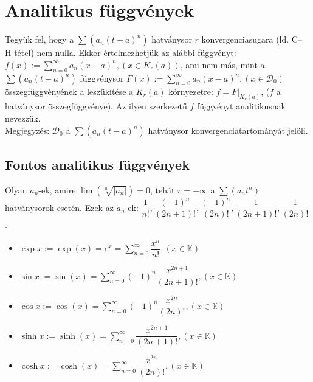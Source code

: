 \documentclass[margin=0px]{article}
\begin{document}
	\section{Analitikus függvények}
	
	Tegyük fel, hogy a $\sum{(a_{n}(t-a)^{n})}$ hatványsor $r$ konvergenciasugara (ld. C--H-tétel) nem nulla. Ekkor értelmezhetjük az alábbi függvényt: $f(x) := \sum\limits_{n=0}^{\infty}{a_{n}(x-a)^{n}}, (x \in K_{r}(a))$, ami nem más, mint a $\sum{(a_{n}(t-a)^{n})}$ függvénysor $F(x) := \sum\limits_{n=0}^{\infty}{a_{n}(x-a)^{n}}, (x \in \mathcal{D}_{0})$ összegfüggvényének a leszűkítése a $K_{r}(a)$ környezetre: $f = F|_{K_{r}(a)}$, ($f$ a hatványsor összegfüggvénye). Az ilyen szerkezetű $f$ függvényt analitikusnak nevezzük. \\
	Megjegyzés: $\mathcal{D}_{0}$ a $\sum{(a_{n}(t-a)^{n})}$ hatványsor konvergenciatartományát jelöli.
	
	\subsection{Fontos analitikus függvények}
	
	Olyan $a_{n}$-ek, amire $\lim{(\sqrt[n]{|a_{n}|})} = 0$, tehát $r = +\infty$ a $\sum{(a_{n}t^{n})}$ hatványsorok esetén. Ezek az $a_{n}$-ek: $\dfrac{1}{n!}, \dfrac{(-1)^n}{(2n+1)!}, \dfrac{(-1)^n}{(2n)!}, \dfrac{1}{(2n+1)!}, \dfrac{1}{(2n)!}$.
	\begin{itemize}
		\item $\exp{x} := \exp{(x)} = e^{x} = \sum\limits_{n=0}^{\infty}{\dfrac{x^n}{n!}, (x \in \mathbb{K})}$
		\item $\sin{x} := \sin{(x)} = \sum\limits_{n=0}^{\infty}{(-1)^n\dfrac{x^{2n+1}}{(2n+1)!}, (x \in \mathbb{K})}$
		\item $\cos{x} := \cos{(x)} = \sum\limits_{n=0}^{\infty}{(-1)^n\dfrac{x^{2n}}{(2n)!}, (x \in \mathbb{K})}$
		\item $\sinh{x} := \sinh{(x)} = \sum\limits_{n=0}^{\infty}{\dfrac{x^{2n+1}}{(2n+1)!}, (x \in \mathbb{K})}$
		\item $\cosh{x} := \cosh{(x)} = \sum\limits_{n=0}^{\infty}{\dfrac{x^{2n}}{(2n)!}, (x \in \mathbb{K})}$
	\end{itemize}
	
\end{document}
